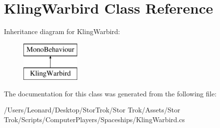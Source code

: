 \hypertarget{class_kling_warbird}{}\section{Kling\+Warbird Class Reference}
\label{class_kling_warbird}
Inheritance diagram for Kling\+Warbird\+:\begin{figure}[H]
\begin{center}
\leavevmode
\includegraphics[height=2.000000cm]{class_kling_warbird}
\end{center}
\end{figure}


The documentation for this class was generated from the following file\+:\begin{DoxyCompactItemize}
\item 
/\+Users/\+Leonard/\+Desktop/\+Stor\+Trok/\+Stor Trok/\+Assets/\+Stor Trok/\+Scripts/\+Computer\+Players/\+Spaceships/Kling\+Warbird.\+cs\end{DoxyCompactItemize}
